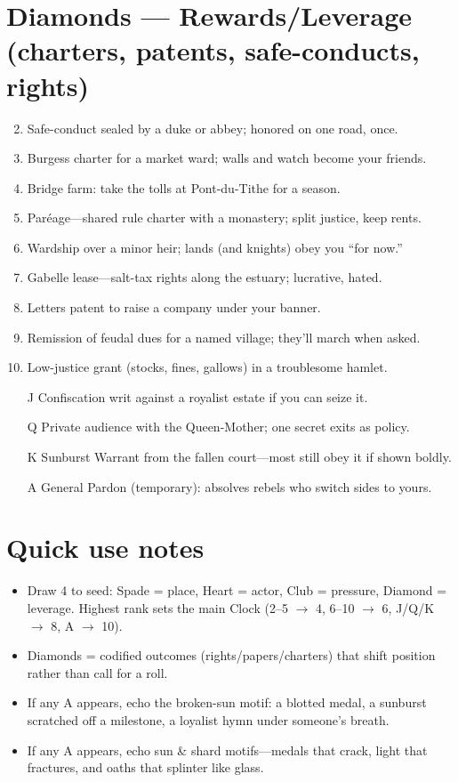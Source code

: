 \section*{Diamonds --- Rewards/Leverage (charters, patents, safe-conducts, rights)}
\label{sec:vhasia-rewards}
\begin{enumerate}
\setcounter{enumi}{1}
\item Safe-conduct sealed by a duke or abbey; honored on one road, once.
\item Burgess charter for a market ward; walls and watch become your friends.
\item Bridge farm: take the tolls at Pont-du-Tithe for a season.
\item Paréage---shared rule charter with a monastery; split justice, keep rents.
\item Wardship over a minor heir; lands (and knights) obey you ``for now.''
\item Gabelle lease---salt-tax rights along the estuary; lucrative, hated.
\item Letters patent to raise a company under your banner.
\item Remission of feudal dues for a named village; they'll march when asked.
\item Low-justice grant (stocks, fines, gallows) in a troublesome hamlet.
\item[J] Confiscation writ against a royalist estate if you can seize it.
\item[Q] Private audience with the Queen-Mother; one secret exits as policy.
\item[K] Sunburst Warrant from the fallen court---most still obey it if shown boldly.
\item[A] General Pardon (temporary): absolves rebels who switch sides to yours.
\end{enumerate}

\section*{Quick use notes}
\label{sec:vhasia-quick-use}
\begin{itemize}
\item Draw 4 to seed: Spade = place, Heart = actor, Club = pressure, Diamond = leverage. Highest rank sets the main Clock (2--5 $\rightarrow$ 4, 6--10 $\rightarrow$ 6, J/Q/K $\rightarrow$ 8, A $\rightarrow$ 10).
\item Diamonds = codified outcomes (rights/papers/charters) that shift position rather than call for a roll.
\item If any A appears, echo the broken-sun motif: a blotted medal, a sunburst scratched off a milestone, a loyalist hymn under someone's breath.
\item If any A appears, echo sun \& shard motifs---medals that crack, light that fractures, and oaths that splinter like glass.
\end{itemize}

